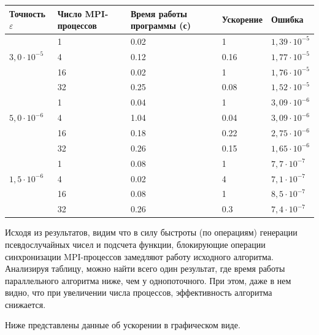     \begin{table}[h]
        \small
        \begin{tabular}{|l|l|l|l|l|}
        \hline
        Точность $\varepsilon$ & Число MPI-процессов & Время работы программы (с) & Ускорение & Ошибка \\
        \hline
        \hline
        \multirow{3}{*}{$3,\!0\cdot 10^{-5}$} & 1 & 0.02 & 1 & $1,\!39\cdot 10^{-5}$ \\ \cline{2-5} 
                               & 4 & 0.12 & 0.16 & $1,\!77\cdot 10^{-5}$ \\ \cline{2-5} 
                               & 16 & 0.02 & 1 & $1,\!76\cdot 10^{-5}$ \\ \cline{2-5}
                               & 32 & 0.25 & 0.08 & $1,\!52\cdot 10^{-5}$ \\ \hline
        \multirow{3}{*}{$5,\!0\cdot 10^{-6}$} & 1 & 0.04 & 1 & $3,\!09\cdot 10^{-6}$ \\ \cline{2-5}
        & 4 & 1.04 & 0.04 & $3,\!09\cdot 10^{-6}$ \\ \cline{2-5} 
        & 16 & 0.18 & 0.22 & $2,\!75\cdot 10^{-6}$ \\ \cline{2-5}
        & 32 & 0.26 & 0.15 & $1,\!65\cdot 10^{-6}$ \\ \hline
        
        \multirow{3}{*}{$1,\!5\cdot 10^{-6}$} & 1 & 0.08 & 1 & $7,\!7\cdot 10^{-7}$ \\ \cline{2-5}
        & 4 & 0.02 & 4 & $7,\!1\cdot 10^{-7}$ \\ \cline{2-5} 
        & 16 & 0.08 & 1 & $8,\!5\cdot 10^{-7}$ \\ \cline{2-5}
        & 32 & 0.26 & 0.3 & $7,\!4\cdot 10^{-7}$ \\ \hline
        \end{tabular}
    \end{table}

    Исходя из результатов, видим что в силу быстроты (по операциям) генерации псевдослучайных чисел и подсчета функции, блокирующие операции синхронизации MPI-процессов замедляют работу исходного алгоритма.
    Анализируя таблицу, можно найти всего один результат, где время работы параллельного алгоритма ниже, чем у однопоточного.
    При этом, даже в нем видно, что при увеличении числа процессов, эффективность алгоритма снижается.

    Ниже представлены данные об ускорении в графическом виде.

